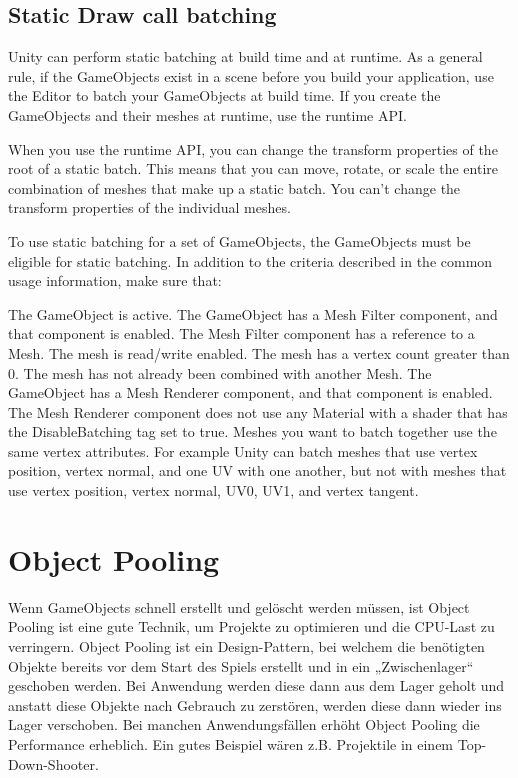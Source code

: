 \subsection{Static Draw call batching}
Unity can perform static batching at build time and at runtime. As a general rule, if the GameObjects
exist in a scene
before you build your application, use the Editor to batch your GameObjects at build time. If you create the GameObjects and their meshes at runtime, use the runtime API.

When you use the runtime API, you can change the transform properties of the root of a static batch. This means that you can move, rotate, or scale the entire combination of meshes that make up a static batch. You can’t change the transform properties of the individual meshes.

To use static batching for a set of GameObjects, the GameObjects must be eligible for static batching. In addition to the criteria described in the common usage information, make sure that:

The GameObject is active.
The GameObject has a Mesh Filter
component, and that component is enabled.
The Mesh Filter component has a reference to a Mesh.
The mesh is read/write enabled.
The mesh has a vertex count greater than 0.
The mesh has not already been combined with another Mesh.
The GameObject has a Mesh Renderer
component, and that component is enabled.
The Mesh Renderer component does not use any Material with a shader
that has the DisableBatching tag set to true.
Meshes you want to batch together use the same vertex attributes. For example Unity can batch meshes that use vertex position, vertex normal, and one UV with one another, but not with meshes that use vertex position, vertex normal, UV0, UV1, and vertex tangent.

\cite{_drawcallbatching}

\section{Object Pooling}
Wenn GameObjects schnell erstellt und gelöscht werden müssen, ist Object Pooling ist eine gute Technik, um Projekte zu optimieren und die CPU-Last zu verringern. Object Pooling ist ein Design-Pattern, bei welchem die benötigten Objekte bereits vor dem Start des Spiels erstellt und in ein „Zwischenlager“ geschoben werden. Bei Anwendung werden diese dann aus dem Lager geholt und anstatt diese Objekte nach Gebrauch zu zerstören, werden diese dann wieder ins Lager verschoben. Bei manchen Anwendungsfällen erhöht Object Pooling die Performance erheblich. Ein gutes Beispiel wären z.B. Projektile in einem Top-Down-Shooter.
\cite{_objectpooling}

